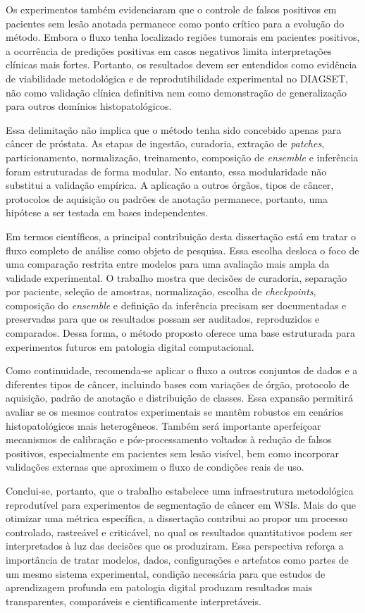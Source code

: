 Os experimentos também evidenciaram que o controle de falsos positivos em pacientes sem lesão anotada permanece como ponto crítico para a evolução do método. Embora o fluxo tenha localizado regiões tumorais em pacientes positivos, a ocorrência de predições positivas em casos negativos limita interpretações clínicas mais fortes. Portanto, os resultados devem ser entendidos como evidência de viabilidade metodológica e de reprodutibilidade experimental no DIAGSET, não como validação clínica definitiva nem como demonstração de generalização para outros domínios histopatológicos. 

Essa delimitação não implica que o método tenha sido concebido apenas para câncer de próstata. As etapas de ingestão, curadoria, extração de \textit{patches}, particionamento, normalização, treinamento, composição de \textit{ensemble} e inferência foram estruturadas de forma modular. No entanto, essa modularidade não substitui a validação empírica. A aplicação a outros órgãos, tipos de câncer, protocolos de aquisição ou padrões de anotação permanece, portanto, uma hipótese a ser testada em bases independentes. 

Em termos científicos, a principal contribuição desta dissertação está em tratar o fluxo completo de análise como objeto de pesquisa. Essa escolha desloca o foco de uma comparação restrita entre modelos para uma avaliação mais ampla da validade experimental. O trabalho mostra que decisões de curadoria, separação por paciente, seleção de amostras, normalização, escolha de \textit{checkpoints}, composição do \textit{ensemble} e definição da inferência precisam ser documentadas e preservadas para que os resultados possam ser auditados, reproduzidos e comparados. Dessa forma, o método proposto oferece uma base estruturada para experimentos futuros em patologia digital computacional. 

Como continuidade, recomenda-se aplicar o fluxo a outros conjuntos de dados e a diferentes tipos de câncer, incluindo bases com variações de órgão, protocolo de aquisição, padrão de anotação e distribuição de classes. Essa expansão permitirá avaliar se os mesmos contratos experimentais se mantêm robustos em cenários histopatológicos mais heterogêneos. Também será importante aperfeiçoar mecanismos de calibração e pós-processamento voltados à redução de falsos positivos, especialmente em pacientes sem lesão visível, bem como incorporar validações externas que aproximem o fluxo de condições reais de uso. 

Conclui-se, portanto, que o trabalho estabelece uma infraestrutura metodológica reprodutível para experimentos de segmentação de câncer em WSIs. Mais do que otimizar uma métrica específica, a dissertação contribui ao propor um processo controlado, rastreável e criticável, no qual os resultados quantitativos podem ser interpretados à luz das decisões que os produziram. Essa perspectiva reforça a importância de tratar modelos, dados, configurações e artefatos como partes de um mesmo sistema experimental, condição necessária para que estudos de aprendizagem profunda em patologia digital produzam resultados mais transparentes, comparáveis e cientificamente interpretáveis.